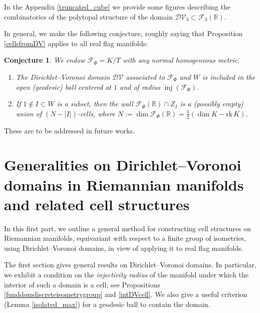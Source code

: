 \documentclass[11pt,twoside]{amsart}
\theoremstyle{plain}
\newtheorem*{conjecture*}{Conjecture}
\newcommand{\R}{{\mathbb R}}
\newcommand{\rk}{\mathrm{rk}\,}
\DeclareMathOperator\inj{inj}
\begin{document}
In the Appendix \ref{truncated_cube} we provide some figures describing the combinatorics of the polytopal structure of the domain $\mathcal{DV}_3\subset\mathcal{F}_3(\R)$.

In general, we make the following conjecture, roughly saying that Proposition \ref{cellsfromDV} applies to all real flag manifolds:
\begin{conjecture*}%
{We endow $\mathcal{F}_\Phi=K/T$ with any normal homogeneous metric.}
\begin{enumerate}
\item The Dirichlet--Voronoi domain $\mathcal{DV}$ associated to $\mathcal{F}_\Phi$ and $W$ is included in the open (geodesic) ball centered at $1$ and of radius $\inj(\mathcal{F}_\Phi)$.
\item If $1\notin I\subset W$ is a subset, then the wall $\mathcal{F}_\Phi(\R)\cap Z_I$ is a (possibly empty) union of $(N-|I|)$-cells, where $N:=\dim\mathcal{F}_\Phi(\R)=\tfrac12(\dim K-\rk K)$.%
\end{enumerate}
\end{conjecture*}
These are to be addressed in future works.







\part{Generalities on Dirichlet--Voronoi domains in Riemannian manifolds and related cell structures}

In this first part, we outline a general method for constructing cell structures on Riemannian manifolds, equivariant with respect to a finite group of isometries, using Dirichlet--Voronoi domains, in view of applying it to real flag manifolds. %

The first section gives general results on Dirichlet--Voronoi domains. In particular, we exhibit a condition on the \textit{injectivity radius} of the manifold under which the interior of such a domain is a cell; see Propositions \ref{funddomdiscreteisometrygroup} and \ref{intDVcell}. We also give a useful criterion (Lemma \ref{isolated_max}) for a geodesic ball to contain the domain.
\end{document}
